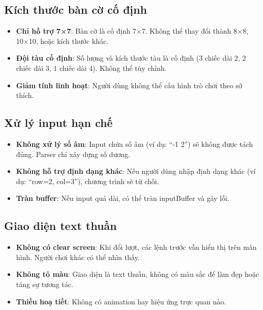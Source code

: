\subsection{Kích thước bàn cờ cố định}

\begin{itemize}
    \item \textbf{Chỉ hỗ trợ 7×7}: Bàn cờ là cố định 7×7. Không thể thay đổi thành 8×8, 10×10, hoặc kích thước khác.
    
    \item \textbf{Đội tàu cố định}: Số lượng và kích thước tàu là cố định (3 chiếc dài 2, 2 chiếc dài 3, 1 chiếc dài 4). Không thể tùy chỉnh.
    
    \item \textbf{Giảm tính linh hoạt}: Người dùng không thể cấu hình trò chơi theo sở thích.
\end{itemize}

\subsection{Xử lý input hạn chế}

\begin{itemize}
    \item \textbf{Không xử lý số âm}: Input chứa số âm (ví dụ: ``-1 2'') sẽ không được tách đúng. Parser chỉ xây dựng số dương.
    
    \item \textbf{Không hỗ trợ định dạng khác}: Nếu người dùng nhập định dạng khác (ví dụ: ``row=2, col=3''), chương trình sẽ từ chối.
    
    \item \textbf{Tràn buffer}: Nếu input quá dài, có thể tràn inputBuffer và gây lỗi.
\end{itemize}

\subsection{Giao diện text thuần}

\begin{itemize}
    \item \textbf{Không có clear screen}: Khi đổi lượt, các lệnh trước vẫn hiển thị trên màn hình. Người chơi khác có thể nhìn thấy.
    
    \item \textbf{Không tô màu}: Giao diện là text thuần, không có màu sắc để làm đẹp hoặc tăng sự tương tác.
    
    \item \textbf{Thiếu hoạ tiết}: Không có animation hay hiệu ứng trực quan nào.
\end{itemize}

